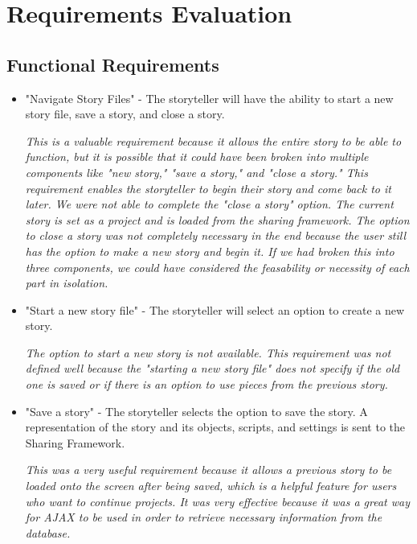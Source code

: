 \documentclass[12pt]{article}
\begin{document}
\section{Requirements Evaluation}
\subsection{Functional Requirements}
\begin{itemize}
\item "Navigate Story Files" - The storyteller will have the ability to start a new story file, save a story, and close a story.\

\textit{This is a valuable requirement because it allows the entire story to be able to function, but it is possible that it could have been broken into multiple components like "new story," "save a story," and "close a story."  This requirement enables the storyteller to begin their story and come back to it later.  We were not able to complete the "close a story" option.  The current story is set as a project and is loaded from the sharing framework.  The option to close a story was not completely necessary in the end because the user still has the option to make a new story and begin it. If we had broken this into three components, we could have considered the feasability or necessity of each part in isolation.}

\item "Start a new story file" - The storyteller will select an option to create a new story.\

\textit{The option to start a new story is not available.  This requirement was not defined well because the "starting a new story file" does not specify if the old one is saved or if there is an option to use pieces from the previous story.}

\item "Save a story" - The storyteller selects the option to save the story.  A representation of the story and its objects, scripts, and settings is sent to the Sharing Framework.\

\textit{This was a very useful requirement because it allows a previous story to be loaded onto the screen after being saved, which is a helpful feature for users who want to continue projects.  It was very effective because it was a great way for AJAX to be used in order to retrieve necessary information from the database.}


\end{itemize}
\end{document}
